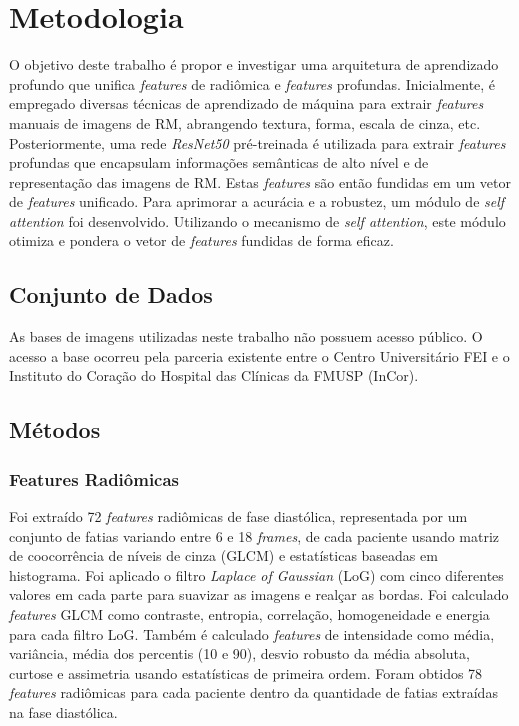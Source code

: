 \chapter{Metodologia} 
\label{chap:metodologia}

O objetivo deste trabalho é propor e investigar uma arquitetura de aprendizado profundo que unifica \textit{features} de radiômica e \textit{features} profundas. Inicialmente, é empregado diversas técnicas de aprendizado de máquina para extrair \textit{features} manuais de imagens de RM, abrangendo textura, forma, escala de cinza, etc. Posteriormente, uma rede \textit{ResNet50} pré-treinada é utilizada para extrair \textit{features} profundas que encapsulam informações semânticas de alto nível e de representação das imagens de RM. Estas \textit{features} são então fundidas em um vetor de \textit{features} unificado. Para aprimorar a acurácia e a robustez, um módulo de \textit{self attention} foi desenvolvido. Utilizando o mecanismo de \textit{self attention}, este módulo otimiza e pondera o vetor de \textit{features} fundidas de forma eficaz.

\section{Conjunto de Dados}
As bases de imagens utilizadas neste trabalho não possuem acesso público. O acesso
a base ocorreu pela parceria existente entre o Centro Universitário FEI e o Instituto do Coração do Hospital das Clínicas da FMUSP (InCor).

\section{Métodos}
\label{sec:cap4_metodos}

\subsection{Features Radiômicas}
\label{subsec:cap4_features_radiomicas}

Foi extraído 72 \textit{features} radiômicas de fase diastólica, representada por um conjunto de fatias variando entre 6 e 18 \textit{frames}, de cada paciente usando matriz de coocorrência de níveis de cinza (GLCM) e estatísticas baseadas em histograma. Foi aplicado o filtro \textit{Laplace of Gaussian} (LoG) com cinco diferentes valores em cada parte para suavizar as imagens e realçar as bordas. Foi calculado \textit{features} GLCM como contraste, entropia, correlação, homogeneidade e energia para cada filtro LoG. Também é calculado \textit{features} de intensidade como média, variância, média dos percentis (10 e 90), desvio robusto da média absoluta, curtose e assimetria usando estatísticas de primeira ordem. Foram obtidos 78 \textit{features} radiômicas para cada paciente dentro da quantidade de fatias extraídas na fase diastólica.

